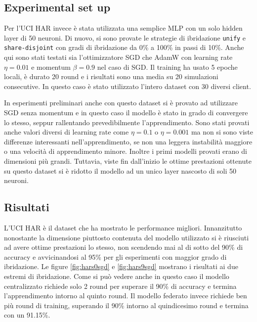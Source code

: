 \subsection{Experimental set up}
Per l'UCI HAR invece è stata utilizzata una semplice MLP con un solo 
hidden layer di 50 neuroni. Di nuovo, si sono provate le 
strategie di ibridazione \texttt{unify} e \texttt{share-disjoint} con 
gradi di ibridazione da 0\% a 100\% in passi di 10\%. Anche qui sono 
stati testati sia l'ottimizzatore SGD che AdamW con learning rate 
\(\eta = 0.01\) e momentum \(\beta = 0.9\) nel caso di SGD. Il 
training ha usato 5 epoche locali, è durato 20 round e i risultati 
sono una media su 20 simulazioni consecutive. In questo caso è stato 
utilizzato l'intero dataset con 30 diversi client.

In esperimenti preliminari anche con questo dataset si è provato ad 
utilizzare SGD senza momentum e in questo caso il modello è stato in 
grado di convergere lo stesso, seppur rallentando prevedibilmente 
l'apprendimento. Sono stati provati anche valori diversi di learning 
rate come \(\eta = 0.1\) o \(\eta = 0.001\) ma non si sono viste 
differenze interessanti nell'apprendimento, se non una leggera 
instabilità maggiore o una velocità di apprendimento minore.
Inoltre i primi modelli provati erano di dimensioni più grandi. 
Tuttavia, viste fin dall'inizio le ottime prestazioni ottenute su 
questo dataset si è ridotto il modello ad un unico layer nascosto di 
soli 50 neuroni.


\subsection{Risultati}
L'UCI HAR è il dataset che ha mostrato le performance migliori.
Innanzitutto nonostante la dimensione piuttosto contenuta del modello
utilizzato si è riusciuti ad avere ottime prestazioni lo stesso, non 
scendendo mai al di sotto del 90\% di accuracy e avvicinandosi al 
95\% per gli esperimenti con maggior grado di ibridazione. Le 
figure \ref{fig:hars0sgd} e \ref{fig:hars9sgd} mostrano i risultati 
ai due estremi di ibridazione.
Come si può vedere anche in questo caso il modello centralizzato 
richiede solo 2 round per superare il 90\% di accuracy e termina 
l'apprendimento intorno al quinto round. Il modello federato invece
richiede ben più round di training, superando il 90\% intorno al 
quindicesimo round e termina con un 91.15\%.

